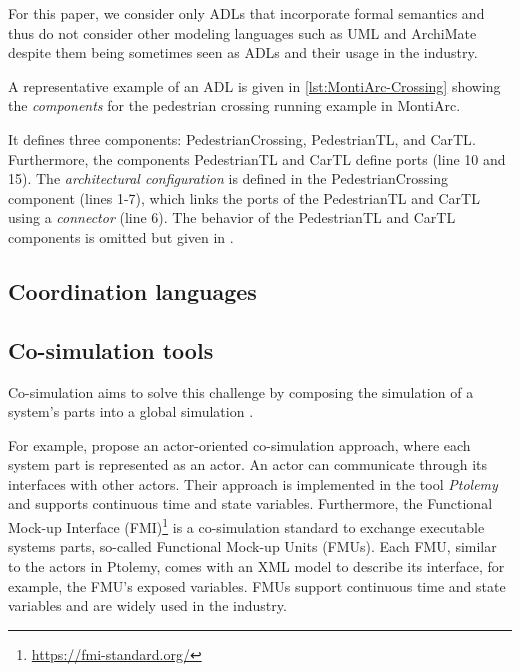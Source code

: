 \documentclass[runningheads]{llncs}
\begin{document}
For this paper, we consider only ADLs that incorporate formal semantics and thus do not consider other modeling languages such as UML \cite{objectmanagementgroupUnifiedModelingLanguage2017} and ArchiMate \cite{theopengroupArchiMateSpecification2023} despite them being sometimes seen as ADLs and their usage in the industry.

A representative example of an ADL is given in  \autoref{lst:MontiArc-Crossing} showing the \textit{components} for the pedestrian crossing running example in MontiArc.



It defines three components: \textsf{PedestrianCrossing}, \textsf{PedestrianTL}, and \textsf{CarTL}.
Furthermore, the components \textsf{PedestrianTL} and \textsf{CarTL} define ports (line 10 and 15).
The \textit{architectural configuration} is defined in the \textsf{PedestrianCrossing} component (lines 1-7), which links the ports of the \textsf{PedestrianTL} and \textsf{CarTL} using a \textit{connector} (line 6).
The behavior of the \textsf{PedestrianTL} and \textsf{CarTL} components is omitted but given in \cite{timkrauterArtifactsCoordination2024}.

\subsection{Coordination languages}
\cite{papadopoulosCoordinationModelsLanguages1998}

\subsection{Co-simulation tools}
\cite{gomesCoSimulationSurvey2019} %

Co-simulation aims to solve this challenge by composing the simulation of a system's parts into a global simulation \cite{gomesCoSimulationSurvey2019}.

For example, \cite{ekerTamingHeterogeneityPtolemy2003} propose an actor-oriented co-simulation approach, where each system part is represented as an actor.
An actor can communicate through its interfaces with other actors.
Their approach is implemented in the tool \textit{Ptolemy} and supports continuous time and state variables.
Furthermore, the Functional Mock-up Interface (FMI)\footnote{\url{https://fmi-standard.org/}} is a co-simulation standard to exchange executable systems parts, so-called Functional Mock-up Units (FMUs).
Each FMU, similar to the actors in Ptolemy, comes with an XML model to describe its interface, for example, the FMU's exposed variables.
FMUs support continuous time and state variables and are widely used in the industry.
\end{document}
